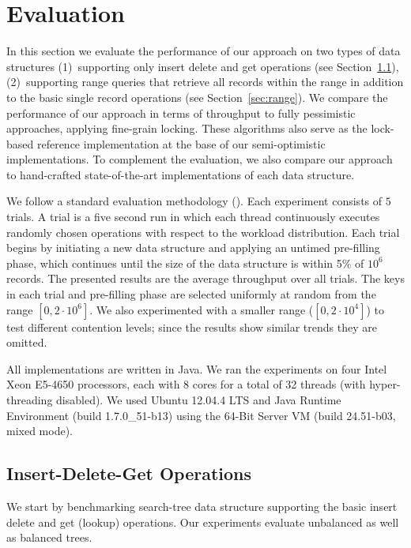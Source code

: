 \section{Evaluation}
\label{sec:eval}

In this section we evaluate the performance of our approach on two types of data
structures (1)~supporting only insert delete and get operations (see
Section~\ref{sec:readwrite}), (2)~supporting range queries that retrieve all
records within the range in addition to the basic single record operations (see
Section~\ref{sec:range}). We compare the performance of our approach in terms of
throughput to fully pessimistic approaches, applying fine-grain locking. These
algorithms also serve as the lock-based reference implementation at the base of
our semi-optimistic implementations. To complement the evaluation, we also
compare our approach to hand-crafted state-of-the-art implementations of each
data structure.         

We follow a standard evaluation methodology
(\cite{DrachslerVY2014,NatarajanM2014,BrownER2014,ArbelA2014}). Each experiment
consists of $5$ trials. A trial is a five second run in which each thread continuously executes
randomly chosen operations with respect to the workload distribution. Each trial
begins by initiating a new data structure and applying an untimed pre-filling
phase, which continues until the size of the data structure is within 5\% of
$10^6$ records. The presented results are the average throughput over all trials.    
The keys in each trial and pre-filling phase are selected uniformly at random
from the range $[0,2\cdot10^6]$.
We also experimented with a smaller range ($[0,2\cdot10^4]$) to test different
contention levels; since the results show similar trends they are omitted. 

All implementations are written in Java. We ran the experiments on four Intel
Xeon E5-4650 processors, each with 8 cores for a total of 32 threads 
(with hyper-threading disabled). 
We used Ubuntu 12.04.4 LTS and Java Runtime Environment (build
1.7.0\_51-b13) using the 64-Bit Server VM (build 24.51-b03, mixed mode).

\subsection{Insert-Delete-Get Operations}
\label{sec:readwrite} 

We start by benchmarking search-tree data structure supporting the basic insert
delete and get (lookup) operations. Our experiments evaluate unbalanced as well
as balanced trees.  


